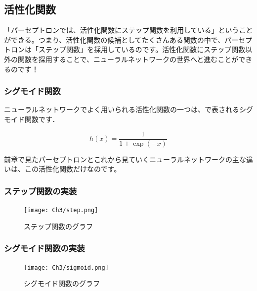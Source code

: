 \subsection{活性化関数}
「パーセプトロンでは、活性化関数にステップ関数を利用している」ということができる。つまり、活性化関数の候補としてたくさんある関数の中で、パーセプトロンは「ステップ関数」を採用しているのです。活性化関数にステップ関数以外の関数を採用することで、ニューラルネットワークの世界へと進むことができるのです！

\subsubsection{シグモイド関数}
ニューラルネットワークでよく用いられる活性化関数の一つは、で表されるシグモイド関数です．

\begin{equation}
    \label{eq:3_sigmoid}
    h(x) = \frac{1}{1 + \exp(-x)}
\end{equation}

前章で見たパーセプトロンとこれから見ていくニューラルネットワークの主な違いは、この活性化関数だけなのです。

\subsubsection{ステップ関数の実装}
\begin{figure}[H]
  \vspace{0mm}
  \begin{center}
    \hspace{0mm}
    \centering
    \texttt{[image: Ch3/step.png]} \
    \vspace{0mm}
    \caption{ステップ関数のグラフ}
    \label{fig:3_step}
  \end{center}
\end{figure}

\subsubsection{シグモイド関数の実装}
\begin{figure}[h]
  \vspace{0mm}
  \begin{center}
    \hspace{0mm}
    \centering
    \texttt{[image: Ch3/sigmoid.png]} \
    \vspace{0mm}
    \caption{シグモイド関数のグラフ}
    \label{fig:3_sigmoid}
  \end{center}
\end{figure}

